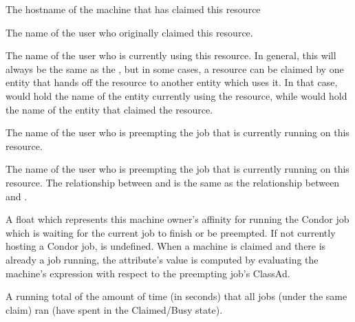 \begin{description}

\item[\AdAttr{ClientMachine}:] The hostname of the machine that has
claimed this resource

\item[\AdAttr{RemoteOwner}:] The name of the user who originally
claimed this resource.

\item[\AdAttr{RemoteUser}:] The name of the user who is currently
using this resource.
In general, this will always be the same as the ,
but in some cases, a resource can be claimed by one entity that hands
off the resource to another entity which uses it.
In that case,  would hold the name of the entity
currently using the resource, while  would hold
the name of the entity that claimed the resource.

\item[\AdAttr{PreemptingOwner}:] The name of the user who is preempting
the job that is currently running on this resource.

\item[\AdAttr{PreemptingUser}:] The name of the user who is preempting
the job that is currently running on this resource.  The relationship
between  and  is the same
as the relationship between  and .

\item[\AdAttr{PreemptingRank}:] A float which represents this machine
owner's affinity for running the Condor job which is waiting for the
current job to finish or be preempted.  If not currently hosting a
Condor job,  is undefined.  When a machine is
claimed and there is already a job running, the attribute's value is
computed by evaluating the machine's  expression with
respect to the preempting job's ClassAd.

\item[\AdAttr{TotalClaimRunTime}:] A running total of the amount of
time (in seconds) that all jobs (under the same claim) ran
(have spent in the Claimed/Busy state).



\end{description}
